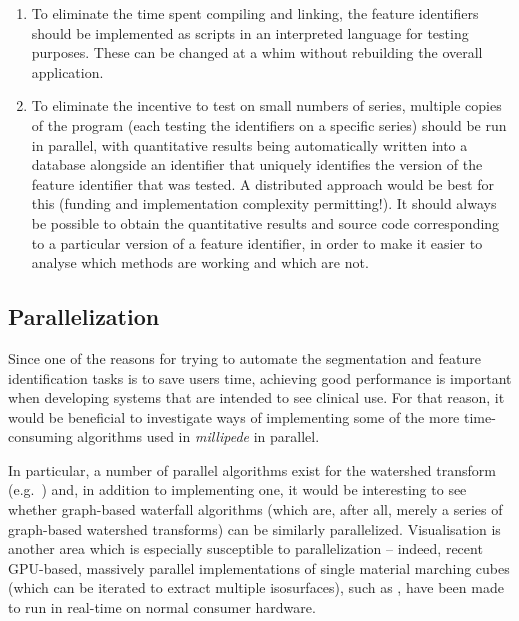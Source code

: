 \begin{itemize}
\begin{enumerate}
\item To eliminate the time spent compiling and linking, the feature identifiers should be implemented as scripts in an interpreted language for testing purposes. These can be changed at a whim without rebuilding the overall application.

\item To eliminate the incentive to test on small numbers of series, multiple copies of the program (each testing the identifiers on a specific series) should be run in parallel, with quantitative results being automatically written into a database alongside an identifier that uniquely identifies the version of the feature identifier that was tested. A distributed approach would be best for this (funding and implementation complexity permitting!). It should always be possible to obtain the quantitative results and source code corresponding to a particular version of a feature identifier, in order to make it easier to analyse which methods are working and which are not.

\end{enumerate}

\end{itemize}

\vspace{-\baselineskip}

\subsection{Parallelization}

Since one of the reasons for trying to automate the segmentation and feature identification tasks is to save users time, achieving good performance is important when developing systems that are intended to see clinical use. For that reason, it would be beneficial to investigate ways of implementing some of the more time-consuming algorithms used in \emph{millipede} in parallel.

In particular, a number of parallel algorithms exist for the watershed transform (e.g.~\cite{bieniek97,moga98}) and, in addition to implementing one, it would be interesting to see whether graph-based waterfall algorithms (which are, after all, merely a series of graph-based watershed transforms) can be similarly parallelized. Visualisation is another area which is especially susceptible to parallelization -- indeed, recent GPU-based, massively parallel implementations of single material marching cubes (which can be iterated to extract multiple isosurfaces), such as \cite{dyken08}, have been made to run in real-time on normal consumer hardware.

